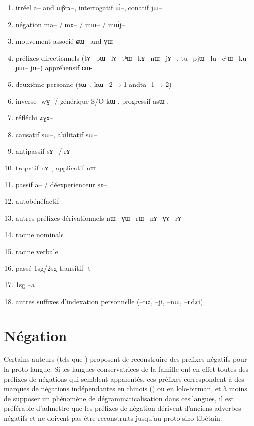 \documentclass[oldfontcommands,oneside,a4paper,11pt]{article}
\newcommand{\ipa}[1]{{\phon \mbox{#1}}} %
\begin{document}
\begin{landscape}
\begin{multicols}{2}
\begin{enumerate}
\item irréel  \ipa{a}-- and \ipa{ɯβrɤ}--, interrogatif \ipa{ɯ́}--, conatif \ipa{jɯ}--
\item négation \ipa{ma}-- / \ipa{mɤ}-- / \ipa{mɯ}-- / \ipa{mɯ́j}--
\item  mouvement associé  \ipa{ɕɯ}-- and \ipa{ɣɯ}-- 
\item préfixes directionnels (\ipa{tɤ}--  \ipa{pɯ}--  \ipa{lɤ}--   \ipa{tʰɯ}--  \ipa{kɤ}--   \ipa{nɯ}--   \ipa{jɤ}-- ,  \ipa{tu}--   \ipa{pjɯ}--   \ipa{lu}--   \ipa{cʰɯ}--   \ipa{ku}--   \ipa{ɲɯ}--   \ipa{ju}--)   appréhensif \ipa{ɕɯ}-
\item deuxième personne (\ipa{tɯ}--, \ipa{kɯ}-- 2$\rightarrow$1 and\ipa{ta-} 1$\rightarrow$2)
\item inverse -\ipa{wɣ}- / générique S/O \ipa{kɯ}-, progressif \ipa{asɯ}-. 
\item réfléchi \ipa{ʑɣɤ}-- 
\item causatif \ipa{sɯ}--, abilitatif \ipa{sɯ}--
\item  antipassif  \ipa{sɤ}-- / \ipa{rɤ}--
\item  tropatif \ipa{nɤ}--, applicatif \ipa{nɯ}--
\item passif \ipa{a}-- / déexperienceur \ipa{sɤ}--
\item autobénéfactif
\item autres préfixes dérivationnels \ipa{nɯ}-- \ipa{ɣɯ}-- \ipa{rɯ}-- \ipa{nɤ}-- \ipa{ɣɤ}-- \ipa{rɤ}--
\item racine nominale
\item racine verbale
\item passé 1sg/2sg transitif -\ipa{t} 
\item 1sg --\ipa{a}
\item autres suffixes d'indexation personnelle (--\ipa{tɕi}, --\ipa{ji}, --\ipa{nɯ}, --\ipa{ndʑi})
\end{enumerate}


\end{multicols}
  \end{landscape}

 



\section{Négation} 
Certains auteurs (tels que \citealt{lapolla03}) proposent de reconstruire des préfixes négatifs pour la proto-langue. Si les langues conservatrices de la famille ont en effet toutes des préfixes de négations qui semblent apparentés, ces préfixes correspondent à des marques de négations indépendantes en chinois (\citealt{djamouri91negation}) ou en lolo-birman, et à moins de supposer un phénomène de dégrammaticalisation dans ces langues, il est préférable d'admettre que les préfixes de négation dérivent d'anciens adverbes négatifs et ne doivent pas être reconstruits jusqu'au proto-sino-tibétain.
\end{document}
